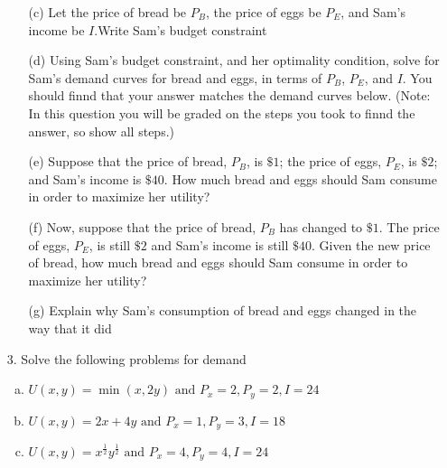 \documentclass[11pt]{article}
\begin{document}
\begin{enumerate}
  \item[] 
  \begin{enumerate}[(a)] 
    \item[(c)] Let the price of bread be $P_B$, the price of eggs be $P_E$, and Sam's income be $I$.Write Sam's budget constraint

    \vspace*{20mm}
    \item[(d)] Using Sam's budget constraint, and her optimality condition, solve for Sam's demand curves for bread and eggs, in terms of $P_B$, $P_E$, and $I$. You should finnd that your answer matches the demand curves below. (Note: In this question you will be graded on the steps you took to finnd the answer, so show all steps.)
    
    \newpage
    \item[(e)] Suppose that the price of bread, $P_B$, is $\$1$; the price of eggs, $P_E$, is $\$2$; and Sam's income is $\$40$. How much bread and eggs should Sam consume in order to maximize her utility?
    
    
    \vspace*{50mm}
    \item[(f)] Now, suppose that the price of bread, $P_B$ has changed to $\$1$. The price of eggs, $P_E$, is still $\$2$ and Sam's income is still $\$40$. Given the new price of bread, how much bread and eggs should Sam consume in order to maximize her utility?
    
    \vspace*{50mm}
    \item[(g)] Explain why Sam's consumption of bread and eggs changed in the way that it did
  \end{enumerate}
\end{enumerate}

\newpage
\begin{enumerate}
  \item[3.] Solve the following problems for demand

  \begin{enumerate}[(a)]
    \item $U(x,y) = \min(x, 2y) \text{ and } P_x = 2, P_y = 2, I = 24$
    
    \vspace*{60mm}
    \item $U(x,y) = 2x + 4y \text{ and } P_x = 1, P_y = 3, I = 18$
    
    \vspace*{60mm}
    \item $U(x,y) = x^{\frac{1}{2}} y^{\frac{1}{2}}  \text{ and } P_x = 4, P_y = 4, I = 24$
  \end{enumerate}
\end{enumerate}
\end{document}
